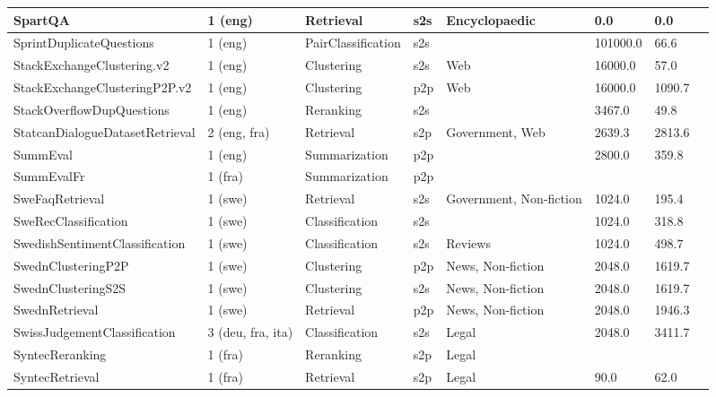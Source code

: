 \begin{longtable}{L{5.0cm}|L{1.5cm}L{1.4cm}L{1.4cm}L{1.4cm}L{1.4cm}L{1.0cm}L{1.0cm}}
 \hline 
SpartQA \cite{xiao2024rar} & 1 (eng) & Retrieval & s2s & Encyclopaedic & 0.0 & 0.0 \\
 \hline 
SprintDuplicateQuestions \cite{shah-etal-2018-adversarial} & 1 (eng) & PairClassification & s2s &  & 101000.0 & 66.6 \\
 \hline 
StackExchangeClustering.v2 \cite{geigle:2021:arxiv} & 1 (eng) & Clustering & s2s & Web & 16000.0 & 57.0 \\
 \hline 
StackExchangeClusteringP2P.v2 \cite{geigle:2021:arxiv} & 1 (eng) & Clustering & p2p & Web & 16000.0 & 1090.7 \\
 \hline 
StackOverflowDupQuestions \cite{Liu2018LinkSOAD} & 1 (eng) & Reranking & s2s &  & 3467.0 & 49.8 \\
 \hline 
StatcanDialogueDatasetRetrieval \cite{lu-etal-2023-statcan} & 2 (eng, fra) & Retrieval & s2p & Government, Web & 2639.3 & 2813.6 \\
 \hline 
SummEval \cite{10.1093/bioinformatics/btx238} & 1 (eng) & Summarization & p2p &  & 2800.0 & 359.8 \\
 \hline 
SummEvalFr \cite{fabbri2020summeval} & 1 (fra) & Summarization & p2p &  &  &  \\
 \hline 
SweFaqRetrieval  & 1 (swe) & Retrieval & s2s & Government, Non-fiction & 1024.0 & 195.4 \\
 \hline 
SweRecClassification \cite{nielsen-2023-scandeval} & 1 (swe) & Classification & s2s &  & 1024.0 & 318.8 \\
 \hline 
SwedishSentimentClassification  & 1 (swe) & Classification & s2s & Reviews & 1024.0 & 498.7 \\
 \hline 
SwednClusteringP2P \cite{monsen2021method} & 1 (swe) & Clustering & p2p & News, Non-fiction & 2048.0 & 1619.7 \\
 \hline 
SwednClusteringS2S \cite{monsen2021method} & 1 (swe) & Clustering & s2s & News, Non-fiction & 2048.0 & 1619.7 \\
 \hline 
SwednRetrieval \cite{monsen2021method} & 1 (swe) & Retrieval & p2p & News, Non-fiction & 2048.0 & 1946.3 \\
 \hline 
SwissJudgementClassification \cite{niklaus2022empirical} & 3 (deu, fra, ita) & Classification & s2s & Legal & 2048.0 & 3411.7 \\
 \hline 
SyntecReranking \cite{ciancone2024extending} & 1 (fra) & Reranking & s2p & Legal &  &  \\
 \hline 
SyntecRetrieval \cite{ciancone2024extending} & 1 (fra) & Retrieval & s2p & Legal & 90.0 & 62.0 \\

\end{longtable}
